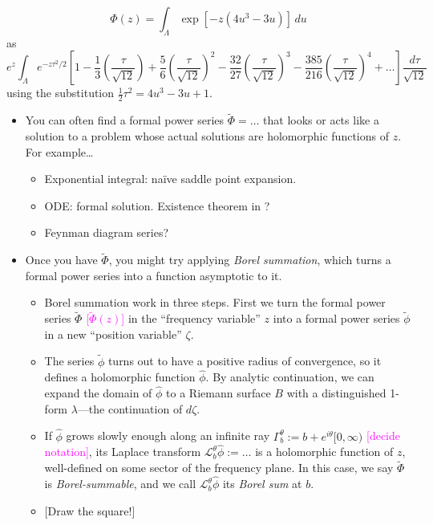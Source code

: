 \documentclass{article}
\newcommand{\laplace}{\mathcal{L}}
\begin{document}
\[ \Phi(z) = \int_{\Lambda} \exp\left[-z \left(4u^3 - 3u\right)\right]\,du \]
as
\[ e^z \int_{\Lambda} e^{-z\tau^2/2} \left[ 1 - \frac{1}{3} \left(\frac{\tau}{\sqrt{12}}\right) + \frac{5}{6} \left(\frac{\tau}{\sqrt{12}}\right)^2 - \frac{32}{27} \left(\frac{\tau}{\sqrt{12}}\right)^3 - \frac{385}{216} \left(\frac{\tau}{\sqrt{12}}\right)^4 + \ldots \right] \frac{d\tau}{\sqrt{12}} \]
using the substitution $\tfrac{1}{2} \tau^2 = 4u^3 - 3u + 1$.
\begin{itemize}
\item You can often find a formal power series $\tilde{\Phi} = \ldots$ that looks or acts like a solution to a problem whose actual solutions are holomorphic functions of $z$. For example\ldots
\begin{itemize}
\item Exponential integral: na\"{i}ve saddle point expansion.
\item ODE: formal solution. Existence theorem in \cite{diverg-resurg-iii}?
\item Feynman diagram series?
\end{itemize}
\item Once you have $\tilde{\Phi}$, you might try applying {\em Borel summation}, which turns a formal power series into a function asymptotic to it.
\begin{itemize}
\item Borel summation work in three steps. First we turn the formal power series $\tilde{\Phi}$ \textcolor{magenta}{[$\tilde{\Phi}(z)$]} in the ``frequency variable'' $z$ into a formal power series $\tilde{\phi}$ in a new ``position variable'' $\zeta$.
\item The series $\tilde{\phi}$ turns out to have a positive radius of convergence, so it defines a holomorphic function $\hat{\phi}$. By analytic continuation, we can expand the domain of $\hat{\phi}$ to a Riemann surface $B$ with a distinguished 1-form $\lambda$---the continuation of $d\zeta$.
\item If $\hat{\phi}$ grows slowly enough along an infinite ray $\Gamma_b^\theta := b + e^{i\theta}[0, \infty)$ \textcolor{magenta}{[decide notation]}, its Laplace transform $\laplace_b^\theta \hat{\phi} := \ldots$ is a holomorphic function of $z$, well-defined on some sector of the frequency plane. In this case, we say $\tilde{\Phi}$ is {\em Borel-summable}, and we call $\laplace_b^\theta \hat{\phi}$ its {\em Borel sum} at $b$.
\item {[Draw the square!]}
\end{itemize}

\end{itemize}
\end{document}
